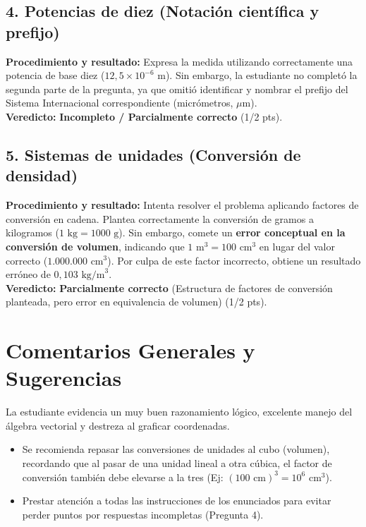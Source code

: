 \documentclass[12pt]{article}
\begin{document}
\subsection*{4. Potencias de diez (Notación científica y prefijo)}
\textbf{Procedimiento y resultado:} Expresa la medida utilizando correctamente una potencia de base diez ($12,5 \times 10^{-6}$ m). Sin embargo, la estudiante no completó la segunda parte de la pregunta, ya que omitió identificar y nombrar el prefijo del Sistema Internacional correspondiente (micrómetros, $\mu$m). \\
\textbf{Veredicto:} \textbf{Incompleto / Parcialmente correcto} (1/2 pts).

\subsection*{5. Sistemas de unidades (Conversión de densidad)}
\textbf{Procedimiento y resultado:} Intenta resolver el problema aplicando factores de conversión en cadena. Plantea correctamente la conversión de gramos a kilogramos ($1 \text{ kg} = 1000 \text{ g}$). Sin embargo, comete un \textbf{error conceptual en la conversión de volumen}, indicando que $1 \text{ m}^3 = 100 \text{ cm}^3$ en lugar del valor correcto ($1.000.000 \text{ cm}^3$). Por culpa de este factor incorrecto, obtiene un resultado erróneo de $0,103 \text{ kg/m}^3$. \\
\textbf{Veredicto:} \textbf{Parcialmente correcto} (Estructura de factores de conversión planteada, pero error en equivalencia de volumen) (1/2 pts).

\vspace{0.5cm}
\section*{Comentarios Generales y Sugerencias}
La estudiante evidencia un muy buen razonamiento lógico, excelente manejo del álgebra vectorial y destreza al graficar coordenadas.
\begin{itemize}
    \item Se recomienda repasar las conversiones de unidades al cubo (volumen), recordando que al pasar de una unidad lineal a otra cúbica, el factor de conversión también debe elevarse a la tres (Ej: $(100 \text{ cm})^3 = 10^6 \text{ cm}^3$).
    \item Prestar atención a todas las instrucciones de los enunciados para evitar perder puntos por respuestas incompletas (Pregunta 4).
\end{itemize}
\end{document}
